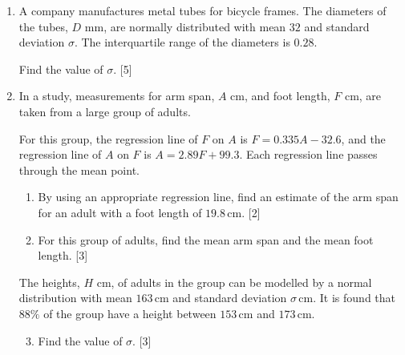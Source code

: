 \documentclass[12pt, twoside]{article}
\begin{document}
\begin{enumerate}[itemsep=0.3cm]

\newpage

\item A company manufactures metal tubes for bicycle frames.
      The diameters of the tubes, $D$ mm, are normally distributed with
      mean $32$ and standard deviation $\sigma$. The interquartile range
      of the diameters is $0.28$.

      Find the value of $\sigma$. \hfill [5]


\newpage

\item In a study, measurements for arm span, $A$ cm, and foot length,
      $F$ cm, are taken from a large group of adults.

      For this group, the regression line of $F$ on $A$ is
      $F = 0.335A - 32.6$, and the regression line of $A$ on $F$ is
      $A = 2.89F + 99.3$. Each regression line passes through the mean point.

      \begin{enumerate}[itemsep=0.1cm]
        \item By using an appropriate regression line, find an estimate of the
              arm span for an adult with a foot length of $19.8$\,cm. \hfill [2]
        \item For this group of adults, find the mean arm span and the
              mean foot length. \hfill [3]
      \end{enumerate}

      The heights, $H$ cm, of adults in the group can be modelled by a normal
      distribution with mean $163$\,cm and standard deviation $\sigma$\,cm.
      It is found that $88\%$ of the group have a height between $153$\,cm
      and $173$\,cm.

      \begin{enumerate}[itemsep=0.1cm,resume]
        \setcounter{enumii}{2}
        \item Find the value of $\sigma$. \hfill [3]
      \end{enumerate}


\end{enumerate}
\end{document}
